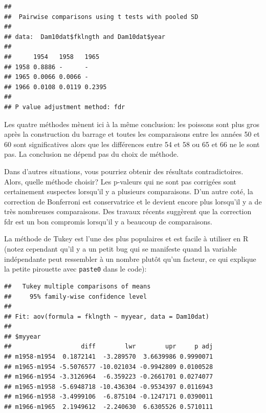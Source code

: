 \documentclass[
  12pt,
]{book}
\newenvironment{Shaded}{\begin{snugshade}}{\end{snugshade}}
\newcommand{\DataTypeTok}[1]{\textcolor[rgb]{0.13,0.29,0.53}{#1}}
\newcommand{\KeywordTok}[1]{\textcolor[rgb]{0.13,0.29,0.53}{\textbf{#1}}}
\newcommand{\NormalTok}[1]{#1}
\newcommand{\OperatorTok}[1]{\textcolor[rgb]{0.81,0.36,0.00}{\textbf{#1}}}
\newcommand{\StringTok}[1]{\textcolor[rgb]{0.31,0.60,0.02}{#1}}
\begin{document}
\begin{verbatim}
## 
##  Pairwise comparisons using t tests with pooled SD 
## 
## data:  Dam10dat$fklngth and Dam10dat$year 
## 
##      1954   1958   1965  
## 1958 0.8886 -      -     
## 1965 0.0066 0.0066 -     
## 1966 0.0108 0.0119 0.2395
## 
## P value adjustment method: fdr
\end{verbatim}

Les quatre méthodes mènent ici à la même conclusion: les poissons sont plus gros après la construction du barrage et toutes les comparaisons entre les années 50 et 60 sont significatives alors que les différences entre 54 et 58 ou 65 et 66 ne le sont pas. La conclusion ne dépend pas du choix de méthode.

Dans d'autres situations, vous pourriez obtenir des résultats contradictoires. Alors, quelle méthode choisir? Les p-valeurs qui ne sont pas corrigées sont certainement suspectes lorsqu'il y a plusieurs comparaisons. D'un autre coté, la correction de Bonferroni est conservatrice et le devient encore plus lorsqu'il y a de très nombreuses comparaisons. Des travaux récents suggèrent que la correction fdr est un bon compromis lorsqu'il y a beaucoup de comparaisons.

La méthode de Tukey est l'une des plus populaires et est facile à utiliser en R (notez cependant qu'il y a un petit bug qui se manifeste quand la variable indépendante peut ressembler à un nombre plutôt qu'un facteur, ce qui explique la petite pirouette avec \texttt{paste0} dans le code):

\begin{Shaded}
\end{Shaded}

\begin{verbatim}
##   Tukey multiple comparisons of means
##     95% family-wise confidence level
## 
## Fit: aov(formula = fklngth ~ myyear, data = Dam10dat)
## 
## $myyear
##                   diff        lwr        upr     p adj
## m1958-m1954  0.1872141  -3.289570  3.6639986 0.9990071
## m1965-m1954 -5.5076577 -10.021034 -0.9942809 0.0100528
## m1966-m1954 -3.3126964  -6.359223 -0.2661701 0.0274077
## m1965-m1958 -5.6948718 -10.436304 -0.9534397 0.0116943
## m1966-m1958 -3.4999106  -6.875104 -0.1247171 0.0390011
## m1966-m1965  2.1949612  -2.240630  6.6305526 0.5710111
\end{verbatim}
\end{document}
